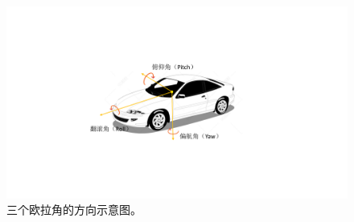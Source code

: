 \begin{figure}[t]
	\centering
	\includegraphics[trim={5cm, 6cm, 5cm, 5cm}, clip,width=\textwidth]{./imgs/euler.pdf}
	\caption{三个欧拉角的方向示意图。}
	\label{fig:euler}
\end{figure}
